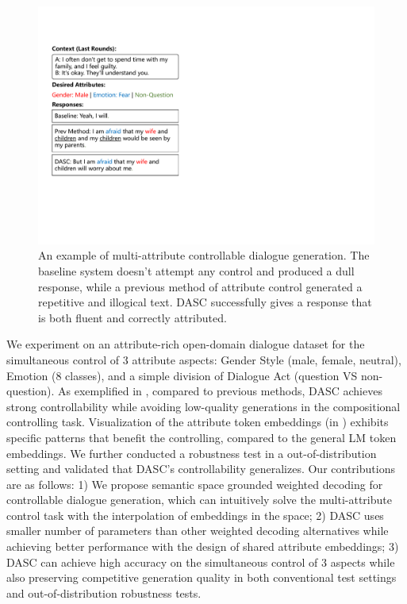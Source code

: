 \begin{figure}[ht]
    \centering
    \includegraphics[width=0.75\columnwidth]{figures/teaser_example.pdf}
    \caption{An example of multi-attribute controllable dialogue generation. 
The baseline system doesn't attempt any control and produced a dull response, 
while a previous method of attribute control generated a repetitive and illogical text. DASC successfully gives a response that is both fluent and 
correctly attributed.}
    \label{fig:teaser_example}
\end{figure}

We experiment on an attribute-rich open-domain dialogue dataset \citep{xu2022long} for the simultaneous control of 3 attribute aspects: Gender Style (male, female, neutral), Emotion (8 classes), and a simple division of Dialogue Act 
(question VS non-question). 
As exemplified in , 
compared to previous methods, DASC achieves strong controllability while 
avoiding low-quality generations in the compositional controlling task. 
Visualization of the attribute token embeddings (in ) 
exhibits specific patterns 
that benefit the controlling, compared to the general LM token embeddings. 
We further conducted a robustness test in a out-of-distribution setting and validated that DASC's controllability generalizes.
Our contributions are as follows: 1) We propose semantic space grounded weighted decoding for controllable dialogue generation, which can intuitively solve the multi-attribute control task with the interpolation of embeddings in the space; 2) DASC uses smaller number of parameters than other weighted decoding alternatives while achieving better performance with the design of shared attribute embeddings; 3) DASC can achieve high accuracy on the simultaneous control of 3 aspects while also preserving competitive generation quality in both conventional test settings and out-of-distribution robustness tests.
